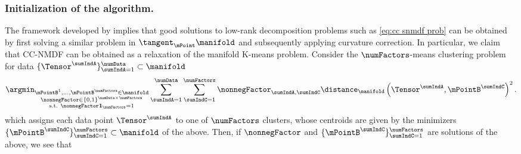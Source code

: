 \subsubsection{Initialization of the algorithm.}
\label{sec:initialization}
The framework developed by \cite{diepeveen2023curvature} implies that good solutions to low-rank decomposition problems such as \eqref{eq:cc snmdf prob} can be obtained by first solving a similar problem in $\tangent_\mPoint \manifold$ and subsequently applying curvature correction. In particular, we claim that CC-NMDF can be obtained as a relaxation of the manifold K-means problem. Consider the $\numFactors$-means clustering problem for data $\{ \Tensor^\sumIndA\}_{\sumIndA = 1}^\numData \subset \manifold$
\begin{equation}
\label{eq:exact kmeans}
    \argmin_{\substack{ \mPointB^1, \dots, \mPointB^\numFactors \in \manifold \\
    \nonnegFactor \in \{0,1\}^{\numData \times \numFactors} \\
    \text{s.t. } \nonnegFactor \mathbf{1}_\numFactors = 1}} \sum_{\sumIndA = 1}^{\numData} \sum_{\sumIndC = 1}^{\numFactors}  \nonnegFactor_{\sumIndA, \sumIndC}\distance_\manifold \left(\Tensor^\sumIndA, \mPointB^\sumIndC\right)^2.
\end{equation}
which assigns each data point $\Tensor^\sumIndA$ to one of $\numFactors$ clusters, whose centroids are given by the minimizers $\{\mPointB^\sumIndC\}_{\sumIndC=1}^\numFactors \subset \manifold$ of the above. Then, if $\nonnegFactor$ and $\{\mPointB^\sumIndC\}_{\sumIndC=1}^\numFactors $ are solutions of the above, we see that 

